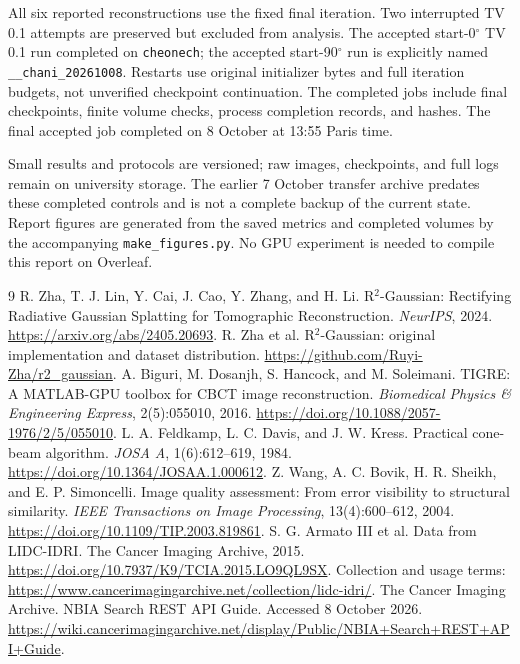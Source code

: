 \documentclass[10pt,a4paper]{article}
\begin{document}
All six reported reconstructions use the fixed final iteration. Two interrupted TV 0.1 attempts are preserved but excluded from analysis. The accepted start-0$^\circ$ TV 0.1 run completed on \texttt{cheonech}; the accepted start-90$^\circ$ run is explicitly named \texttt{\_\_chani\_20261008}. Restarts use original initializer bytes and full iteration budgets, not unverified checkpoint continuation. The completed jobs include final checkpoints, finite volume checks, process completion records, and hashes. The final accepted job completed on 8 October at 13:55 Paris time.

Small results and protocols are versioned; raw images, checkpoints, and full logs remain on university storage. The earlier 7 October transfer archive predates these completed controls and is not a complete backup of the current state. Report figures are generated from the saved metrics and completed volumes by the accompanying \texttt{make\_figures.py}. No GPU experiment is needed to compile this report on Overleaf.

\begin{thebibliography}{9}\small
{} R. Zha, T. J. Lin, Y. Cai, J. Cao, Y. Zhang, and H. Li. R$^2$-Gaussian: Rectifying Radiative Gaussian Splatting for Tomographic Reconstruction. \emph{NeurIPS}, 2024. \url{https://arxiv.org/abs/2405.20693}.
 R. Zha et al. R$^2$-Gaussian: original implementation and dataset distribution. \url{https://github.com/Ruyi-Zha/r2_gaussian}.
 A. Biguri, M. Dosanjh, S. Hancock, and M. Soleimani. TIGRE: A MATLAB-GPU toolbox for CBCT image reconstruction. \emph{Biomedical Physics \& Engineering Express}, 2(5):055010, 2016. \url{https://doi.org/10.1088/2057-1976/2/5/055010}.
 L. A. Feldkamp, L. C. Davis, and J. W. Kress. Practical cone-beam algorithm. \emph{JOSA A}, 1(6):612--619, 1984. \url{https://doi.org/10.1364/JOSAA.1.000612}.
 Z. Wang, A. C. Bovik, H. R. Sheikh, and E. P. Simoncelli. Image quality assessment: From error visibility to structural similarity. \emph{IEEE Transactions on Image Processing}, 13(4):600--612, 2004. \url{https://doi.org/10.1109/TIP.2003.819861}.
 S. G. Armato III et al. Data from LIDC-IDRI. The Cancer Imaging Archive, 2015. \url{https://doi.org/10.7937/K9/TCIA.2015.LO9QL9SX}. Collection and usage terms: \url{https://www.cancerimagingarchive.net/collection/lidc-idri/}.
 The Cancer Imaging Archive. NBIA Search REST API Guide. Accessed 8 October 2026. \url{https://wiki.cancerimagingarchive.net/display/Public/NBIA+Search+REST+API+Guide}.
\end{thebibliography}
\end{document}
